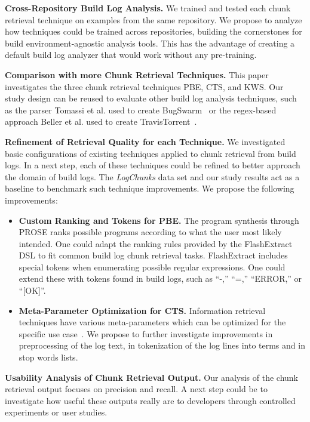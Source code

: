 \textbf{Cross-Repository Build Log Analysis.}
We trained and
tested each chunk retrieval technique on examples from the same
repository.
We propose to analyze how techniques could be trained
across repositories, building the cornerstones for build
environment-agnostic analysis tools.
This has the advantage of creating
a default build log analyzer that would work without any pre-training.

\textbf{Comparison with more Chunk Retrieval Techniques.}
This
paper investigates the three chunk retrieval techniques PBE, CTS, and
KWS\@.
Our study design can be reused to evaluate other build log
analysis techniques, such as the parser Tomassi et al.
used to create
BugSwarm~\cite{tomassi2019bugswarm} or the regex-based approach
Beller et al.
used to create TravisTorrent~\cite{beller2017oops}.

\textbf{Refinement of Retrieval Quality for each Technique.} We
investigated basic configurations of existing techniques applied to
chunk retrieval from build logs.
In a next step, each of these
techniques could be refined to better approach the domain of build
logs.
The \emph{LogChunks} data set and our study results act as a
baseline to benchmark such technique improvements.
We propose the
following improvements:
\begin{itemize}[leftmargin=0.4cm]
  \item \textbf{Custom Ranking and Tokens for PBE.} The program
  synthesis through PROSE ranks possible programs according to
  what the user most likely intended.
  One could adapt the ranking
  rules provided by the FlashExtract DSL to fit common build log
  chunk retrieval tasks.
  FlashExtract includes special tokens when
  enumerating possible regular expressions.
  One could extend these
  with tokens found in build logs, such as ``-,''
	``=,'' ``ERROR,''
  or ``[OK]''.
  \item \textbf{Meta-Parameter Optimization for CTS.} Information
  retrieval techniques have various meta-parameters which can be
  optimized for the specific use
  case~\cite{panichella2016parameterizing}.
  We propose to further
  investigate improvements in preprocessing of the log text, in
  tokenization of the log lines into terms and in stop words
  lists.
\end{itemize}

\textbf{Usability Analysis of Chunk Retrieval Output.}
Our
analysis of the chunk retrieval output focuses on
precision and recall.
A next step could be to investigate how useful these
outputs really are to developers through controlled experiments or
user studies.

